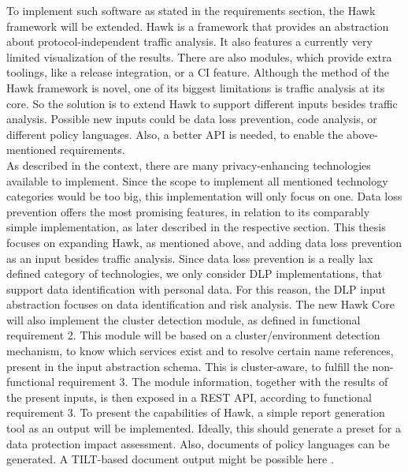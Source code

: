 To implement such software as stated in the requirements section, the Hawk framework will be extended. Hawk is a framework that provides an abstraction about protocol-independent traffic analysis. It also features a currently very limited visualization of the results. There are also modules, which provide extra toolings, like a release integration, or a CI feature.
Although the method of the Hawk framework is novel, one of its biggest limitations is traffic analysis at its core. So the solution is to extend Hawk to support different inputs besides traffic analysis. Possible new inputs could be data loss prevention, code analysis, or different policy languages. Also, a better API is needed, to enable the above-mentioned requirements.\\

As described in the context, there are many privacy-enhancing technologies available to implement. Since the scope to implement all mentioned technology categories would be too big, this implementation will only focus on one. Data loss prevention offers the most promising features, in relation to its comparably simple implementation, as later described in the respective section. This thesis focuses on expanding Hawk, as mentioned above, and adding data loss prevention as an input besides traffic analysis. Since data loss prevention is a really lax defined category of technologies, we only consider DLP implementations, that support data identification with personal data. For this reason, the DLP input abstraction focuses on data identification and risk analysis. The new Hawk Core will also implement the cluster detection module, as defined in functional requirement 2. This module will be based on a cluster/environment detection mechanism, to know which services exist and to resolve certain name references, present in the input abstraction schema. This is cluster-aware, to fulfill the non-functional requirement 3. The module information, together with the results of the present inputs, is then exposed in a REST API, according to functional requirement 3. To present the capabilities of Hawk, a simple report generation tool as an output will be implemented. Ideally, this should generate a preset for a data protection impact assessment. Also, documents of policy languages can be generated. A TILT-based document output might be possible here \cite{grunewald_tilt_2020}.\\